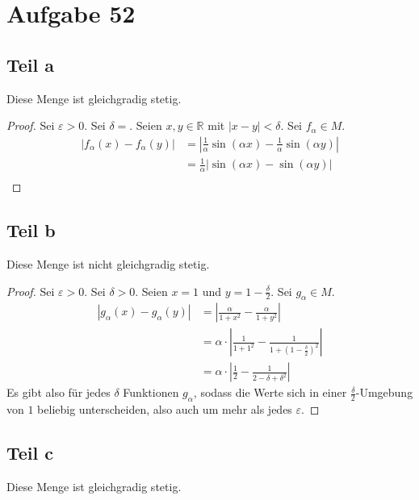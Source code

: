 \documentclass[10pt,a4paper]{article}
\begin{document}
\section*{Aufgabe 52}

\subsection*{Teil a}

Diese Menge ist gleichgradig stetig.

\begin{proof}
Sei $\varepsilon > 0$.
Sei $\delta = $.
Seien $x, y \in \mathbb{R}$ mit $|x - y| < \delta$.
Sei $f_{\alpha} \in M$.
\begin{align*}
|f_{\alpha}(x) - f_{\alpha}(y)| & = |\frac{1}{\alpha}\sin(\alpha x) - \frac{1}{\alpha}\sin(\alpha y)|\\
& = \frac{1}{\alpha}|\sin(\alpha x) - \sin(\alpha y)|\\
\end{align*}
\end{proof}

\subsection*{Teil b}

Diese Menge ist nicht gleichgradig stetig.

\begin{proof}
Sei $\varepsilon > 0$.
Sei $\delta > 0$.
Seien $x = 1$ und $y = 1 - \frac{\delta}{2}$.
Sei $g_{\alpha} \in M$.
\begin{align*}
|g_{\alpha}(x) - g_{\alpha}(y)| & = |\frac{\alpha}{1 + x^{2}} - \frac{\alpha}{1 + y^{2}}|\\
& = \alpha \cdot |\frac{1}{1 + 1^{2}} - \frac{1}{1 + (1 - \frac{\delta}{2})^{2}}|\\
& = \alpha \cdot |\frac{1}{2} - \frac{1}{2 - \delta + \delta^{2}}|
\end{align*}
Es gibt also für jedes $\delta$ Funktionen $g_{\alpha}$, sodass die Werte sich in einer $\frac{\delta}{2}$-Umgebung von $1$ beliebig unterscheiden, also auch um mehr als jedes $\varepsilon$.
\end{proof}

\subsection*{Teil c}

Diese Menge ist gleichgradig stetig.
\end{document}
